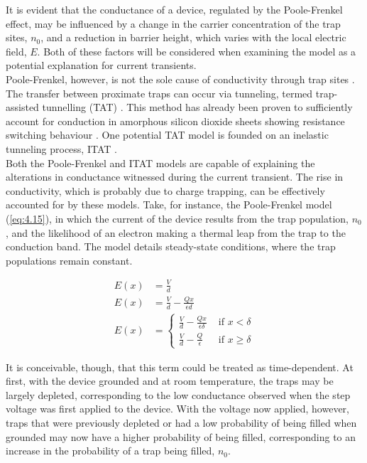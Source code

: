 \noindent It is evident that the conductance of a device, regulated by the Poole-Frenkel effect, may be influenced by a change in the carrier concentration of the trap sites, $n_0$, and a reduction in barrier height, which varies with the local electric field, $E$. Both of these factors will be considered when examining the model as a potential explanation for current transients.\\

\noindent Poole-Frenkel, however, is not the sole cause of conductivity through trap sites \cite{dimaria1995mechanism}. The transfer between proximate traps can occur via tunneling, termed trap-assisted tunnelling (TAT) \cite{jimenez2001physical}. This method has already been proven to sufficiently account for conduction in amorphous silicon dioxide sheets showing resistance switching behaviour \cite{mehonic2012resistive}. One potential TAT model is founded on an inelastic tunneling process, ITAT \cite{ielmini2000modelingII}.\\

\noindent Both the Poole-Frenkel and ITAT models are capable of explaining the alterations in conductance witnessed during the current transient. The rise in conductivity, which is probably due to charge trapping, can be effectively accounted for by these models. Take, for instance, the Poole-Frenkel model (\ref{eq:4.15}), in which the current of the device results from the trap population, $n_0$, and the likelihood of an electron making a thermal leap from the trap to the conduction band. The model details steady-state conditions, where the trap populations remain constant.

\begin{align}
    E(x) &= \frac{V}{d} \label{eq:4.16} \\
    E(x) &= \frac{V}{d} - \frac{Qx}{\epsilon d} \label{eq:4.17}\\
    E(x) &= \begin{cases}
\frac{V}{d} - \frac{Qx}{\epsilon \delta} & \text{ if } x< \delta \\ 
\frac{V}{d} - \frac{Q}{\epsilon} & \text{ if } x\geq \delta 
\end{cases} \label{eq:4.18}
\end{align}


\noindent It is conceivable, though, that this term could be treated as time-dependent. At first, with the device grounded and at room temperature, the traps may be largely depleted, corresponding to the low conductance observed when the step voltage was first applied to the device. With the voltage now applied, however, traps that were previously depleted or had a low probability of being filled when grounded may now have a higher probability of being filled, corresponding to an increase in the probability of a trap being filled, $n_0$.\\

